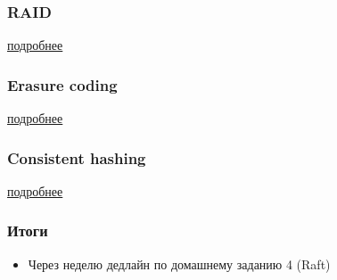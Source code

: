 \documentclass{beamer}
\begin{document}
\begin{frame}
\frametitle{RAID}

\href{https://ru.wikipedia.org/wiki/RAID}{подробнее}

\end{frame}

\begin{frame}
\frametitle{Erasure coding}

\href{https://ytsaurus.tech/docs/ru/user-guide/storage/replication}{подробнее}

\end{frame}

\begin{frame}
\frametitle{Consistent hashing}

\href{https://www.geeksforgeeks.org/system-design/sharding-vs-consistent-hashing/}{подробнее}

\end{frame}

\begin{frame}
\frametitle{Итоги}

\begin{itemize}
    \item Через неделю дедлайн по домашнему заданию 4 (Raft)
\end{itemize}

\end{frame}
\end{document}
